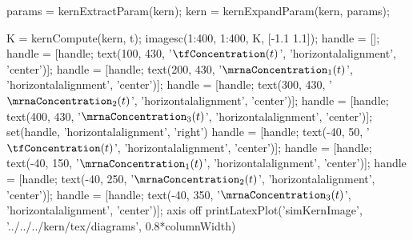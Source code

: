 \begin{frame}[labels=skipGPProperties,fragile]
\begin{columns}[c]
\begin{center}
\begin{octave}
        params = kernExtractParam(kern);
        kern = kernExpandParam(kern, params);
  
        K = kernCompute(kern, t);
        imagesc(1:400, 1:400, K, [-1.1 1.1]);
        handle = [];
        handle = [handle; text(100, 430, '\small $\tfConcentration(t)$', 'horizontalalignment', 'center')];
        handle = [handle; text(200, 430, '\small $\mrnaConcentration_1(t)$', 'horizontalalignment', 'center')];
        handle = [handle; text(300, 430, '\small $\mrnaConcentration_2(t)$', 'horizontalalignment', 'center')];
        handle = [handle; text(400, 430, '\small $\mrnaConcentration_3(t)$', 'horizontalalignment', 'center')];
        set(handle, 'horizontalalignment', 'right')
        handle = [handle; text(-40, 50, '\small $\tfConcentration(t)$', 'horizontalalignment', 'center')];
        handle = [handle; text(-40, 150, '\small $\mrnaConcentration_1(t)$', 'horizontalalignment', 'center')];
        handle = [handle; text(-40, 250, '\small $\mrnaConcentration_2(t)$', 'horizontalalignment', 'center')];
        handle = [handle; text(-40, 350, '\small $\mrnaConcentration_3(t)$', 'horizontalalignment', 'center')];
        axis off
        printLatexPlot('simKernImage', '../../../kern/tex/diagrams', 0.8*columnWidth) 
      \end{octave}
    \end{center}
  \end{columns}
\end{frame}

